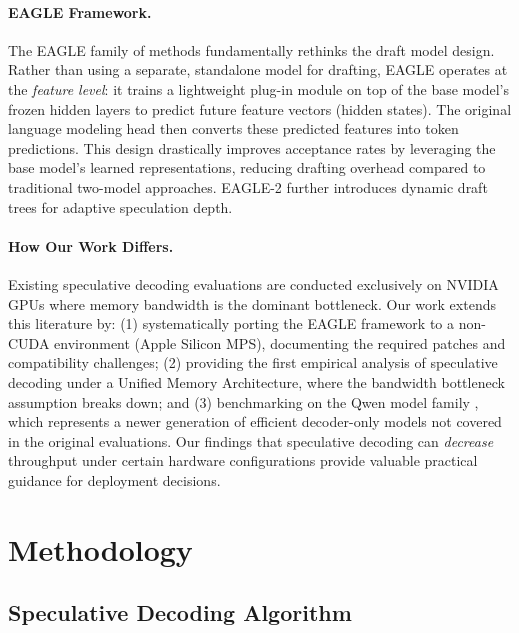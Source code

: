 \documentclass[11pt]{article}
\begin{document}
\paragraph{EAGLE Framework.}
The EAGLE family of methods \citep{li2024eagle, li2024eagle2} fundamentally rethinks the draft model design. Rather than using a separate, standalone model for drafting, EAGLE operates at the \emph{feature level}: it trains a lightweight plug-in module on top of the base model's frozen hidden layers to predict future feature vectors (hidden states). The original language modeling head then converts these predicted features into token predictions. This design drastically improves acceptance rates by leveraging the base model's learned representations, reducing drafting overhead compared to traditional two-model approaches. EAGLE-2 further introduces dynamic draft trees for adaptive speculation depth.

\paragraph{How Our Work Differs.}
Existing speculative decoding evaluations \citep{leviathan2023fast, chen2023accelerating, li2024eagle} are conducted exclusively on NVIDIA GPUs where memory bandwidth is the dominant bottleneck. Our work extends this literature by: (1) systematically porting the EAGLE framework to a non-CUDA environment (Apple Silicon MPS), documenting the required patches and compatibility challenges; (2) providing the first empirical analysis of speculative decoding under a Unified Memory Architecture, where the bandwidth bottleneck assumption breaks down; and (3) benchmarking on the Qwen model family \citep{qwen2024}, which represents a newer generation of efficient decoder-only models not covered in the original evaluations. Our findings that speculative decoding can \textit{decrease} throughput under certain hardware configurations provide valuable practical guidance for deployment decisions.

\section{Methodology}

\subsection{Speculative Decoding Algorithm}
\end{document}
